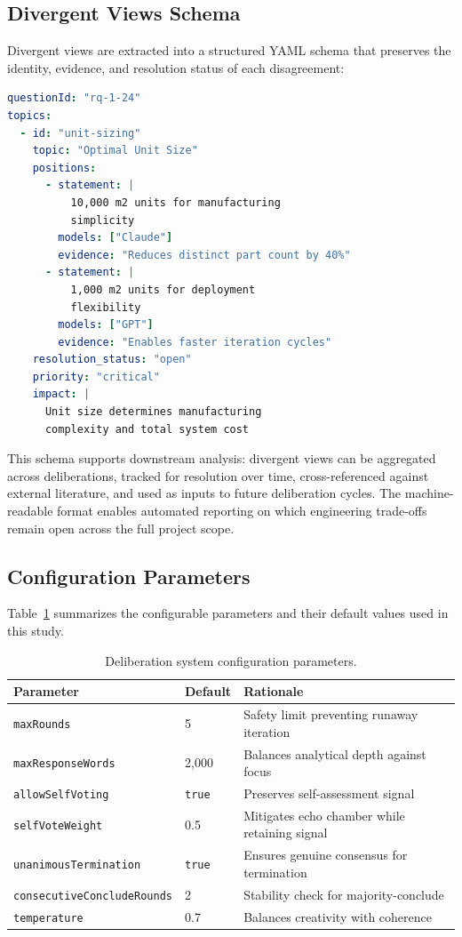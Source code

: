 \documentclass[11pt,a4paper]{article}
\begin{document}
\subsection{Divergent Views Schema}
\label{sec:divergent}

Divergent views are extracted into a structured YAML schema that preserves the identity, evidence, and resolution status of each disagreement:

\begin{lstlisting}[language=yaml,caption={Divergent views schema with model attribution.}]
questionId: "rq-1-24"
topics:
  - id: "unit-sizing"
    topic: "Optimal Unit Size"
    positions:
      - statement: |
          10,000 m2 units for manufacturing
          simplicity
        models: ["Claude"]
        evidence: "Reduces distinct part count by 40%"
      - statement: |
          1,000 m2 units for deployment
          flexibility
        models: ["GPT"]
        evidence: "Enables faster iteration cycles"
    resolution_status: "open"
    priority: "critical"
    impact: |
      Unit size determines manufacturing
      complexity and total system cost
\end{lstlisting}

This schema supports downstream analysis: divergent views can be aggregated across deliberations, tracked for resolution over time, cross-referenced against external literature, and used as inputs to future deliberation cycles. The machine-readable format enables automated reporting on which engineering trade-offs remain open across the full project scope.

\subsection{Configuration Parameters}
\label{sec:config}

Table~\ref{tab:config} summarizes the configurable parameters and their default values used in this study.

\begin{table}[ht]
\centering
\caption{Deliberation system configuration parameters.}
\label{tab:config}
\begin{tabular}{@{}llp{5.5cm}@{}}
\toprule
\textbf{Parameter} & \textbf{Default} & \textbf{Rationale} \\
\midrule
\texttt{maxRounds} & 5 & Safety limit preventing runaway iteration \\
\texttt{maxResponseWords} & 2{,}000 & Balances analytical depth against focus \\
\texttt{allowSelfVoting} & \texttt{true} & Preserves self-assessment signal \\
\texttt{selfVoteWeight} & 0.5 & Mitigates echo chamber while retaining signal \\
\texttt{unanimousTermination} & \texttt{true} & Ensures genuine consensus for termination \\
\texttt{consecutiveConcludeRounds} & 2 & Stability check for majority-conclude \\
\texttt{temperature} & 0.7 & Balances creativity with coherence \\
\bottomrule
\end{tabular}
\end{table}
\end{document}
